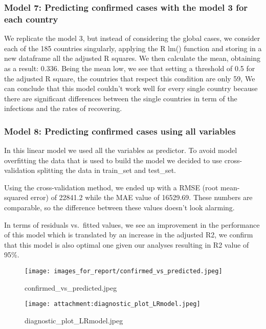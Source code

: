 \documentclass[11pt]{article}
\makeatletter
\def\maxwidth{\ifdim\Gin@nat@width>\linewidth\linewidth
    \else\Gin@nat@width\fi}
\let\Oldincludegraphics\includegraphics
\renewcommand{\includegraphics}[1]{\Oldincludegraphics[width=.8\maxwidth]{#1}}
\makeatother
\begin{document}
\hypertarget{model-7-predicting-confirmed-cases-with-the-model-3-for-each-country}{%
\subsubsection{Model 7: Predicting confirmed cases with the model 3 for
each
country}\label{model-7-predicting-confirmed-cases-with-the-model-3-for-each-country}}

We replicate the model 3, but instead of considering the global cases,
we consider each of the 185 countries singularly, applying the R lm()
function and storing in a new dataframe all the adjusted R squares. We
then calculate the mean, obtaining as a result: 0.336. Being the mean
low, we see that setting a threshold of 0.5 for the adjusted R square,
the countries that respect this condition are only 59, We can conclude
that this model couldn't work well for every single country because
there are significant differences between the single countries in term
of the infections and the rates of recovering.

    \hypertarget{model-8-predicting-confirmed-cases-using-all-variables}{%
\subsubsection{Model 8: Predicting confirmed cases using all
variables}\label{model-8-predicting-confirmed-cases-using-all-variables}}

In this linear model we used all the variables as predictor. To avoid
model overfitting the data that is used to build the model we decided to
use cross-validation splitting the data in train\_set and test\_set.

Using the cross-validation method, we ended up with a RMSE (root
mean-squared error) of 22841.2 while the MAE value of 16529.69. These
numbers are comparable, so the difference between these values doesn't
look alarming.

In terms of residuals vs.~fitted values, we see an improvement in the
performance of this model which is translated by an increase in the
adjusted R2, we confirm that this model is also optimal one given our
analyses resulting in R2 value of 95\%.

\begin{figure}
\centering
\texttt{[image: images\_for\_report/confirmed\_vs\_predicted.jpeg]}
\caption{confirmed\_vs\_predicted.jpeg}
\end{figure}

\begin{figure}
\centering
\texttt{[image: attachment:diagnostic\_plot\_LRmodel.jpeg]}
\caption{diagnostic\_plot\_LRmodel.jpeg}
\end{figure}
\end{document}
